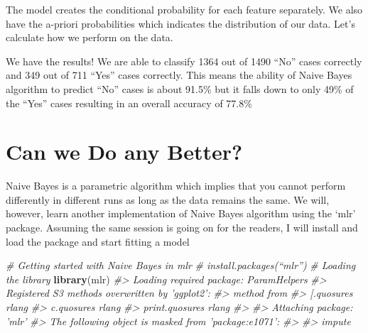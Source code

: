 \documentclass[]{book}
\newenvironment{Shaded}{\begin{snugshade}}{\end{snugshade}}
\newcommand{\CommentTok}[1]{\textcolor[rgb]{0.56,0.35,0.01}{\textit{#1}}}
\newcommand{\KeywordTok}[1]{\textcolor[rgb]{0.13,0.29,0.53}{\textbf{#1}}}
\newcommand{\NormalTok}[1]{#1}
\newcommand{\OperatorTok}[1]{\textcolor[rgb]{0.81,0.36,0.00}{\textbf{#1}}}
\begin{document}
The model creates the conditional probability for each feature separately. We also have the a-priori probabilities which indicates the distribution of our data. Let's calculate how we perform on the data.

\begin{Shaded}
\end{Shaded}

We have the results! We are able to classify 1364 out of 1490 ``No'' cases correctly and 349 out of 711 ``Yes'' cases correctly. This means the ability of Naive Bayes algorithm to predict ``No'' cases is about 91.5\% but it falls down to only 49\% of the ``Yes'' cases resulting in an overall accuracy of 77.8\%

\hypertarget{can-we-do-any-better}{%
\chapter{Can we Do any Better?}\label{can-we-do-any-better}}

Naive Bayes is a parametric algorithm which implies that you cannot perform differently in different runs as long as the data remains the same. We will, however, learn another implementation of Naive Bayes algorithm using the `mlr' package. Assuming the same session is going on for the readers, I will install and load the package and start fitting a model

\begin{Shaded}
\begin{Highlighting}[]
\CommentTok{# Getting started with Naive Bayes in mlr}
\CommentTok{# install.packages(“mlr”)}
\CommentTok{# Loading the library}
\KeywordTok{library}\NormalTok{(mlr)}
\CommentTok{#> Loading required package: ParamHelpers}
\CommentTok{#> Registered S3 methods overwritten by 'ggplot2':}
\CommentTok{#>   method         from }
\CommentTok{#>   [.quosures     rlang}
\CommentTok{#>   c.quosures     rlang}
\CommentTok{#>   print.quosures rlang}
\CommentTok{#> }
\CommentTok{#> Attaching package: 'mlr'}
\CommentTok{#> The following object is masked from 'package:e1071':}
\CommentTok{#> }
\CommentTok{#>     impute}
\end{Highlighting}
\end{Shaded}
\end{document}
